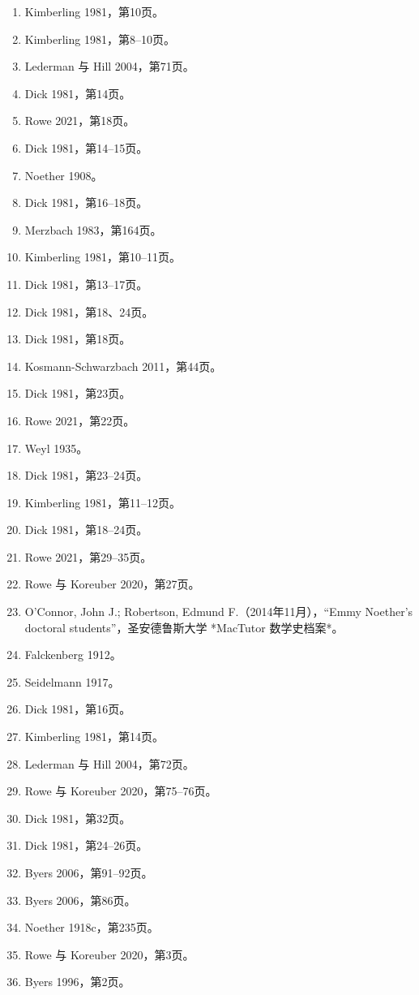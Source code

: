 \begin{enumerate}
\item Kimberling 1981，第10页。
\item Kimberling 1981，第8–10页。
\item Lederman 与 Hill 2004，第71页。
\item Dick 1981，第14页。
\item Rowe 2021，第18页。
\item Dick 1981，第14–15页。
\item Noether 1908。
\item Dick 1981，第16–18页。
\item Merzbach 1983，第164页。
\item Kimberling 1981，第10–11页。
\item Dick 1981，第13–17页。
\item Dick 1981，第18、24页。
\item Dick 1981，第18页。
\item Kosmann-Schwarzbach 2011，第44页。
\item Dick 1981，第23页。
\item Rowe 2021，第22页。
\item Weyl 1935。
\item Dick 1981，第23–24页。
\item Kimberling 1981，第11–12页。
\item Dick 1981，第18–24页。
\item Rowe 2021，第29–35页。
\item Rowe 与 Koreuber 2020，第27页。
\item O'Connor, John J.; Robertson, Edmund F.（2014年11月），“Emmy Noether's doctoral students”，圣安德鲁斯大学 *MacTutor 数学史档案*。
\item Falckenberg 1912。
\item Seidelmann 1917。
\item Dick 1981，第16页。
\item Kimberling 1981，第14页。
\item Lederman 与 Hill 2004，第72页。
\item Rowe 与 Koreuber 2020，第75–76页。
\item Dick 1981，第32页。
\item Dick 1981，第24–26页。
\item Byers 2006，第91–92页。
\item Byers 2006，第86页。
\item Noether 1918c，第235页。
\item Rowe 与 Koreuber 2020，第3页。
\item Byers 1996，第2页。

\end{enumerate}
